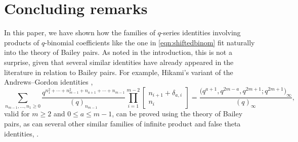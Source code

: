\documentclass[pdftex]{sigma}
\numberwithin{equation}{section}
\begin{document}
\section{Concluding remarks}
In this paper, we have shown how the families of $q$-series identities involving products of $q$-binomial coefficients like the one in \eqref{eqn:shiftedbinom} fit naturally into the theory of Bailey pairs. As noted in the introduction, this is not a surprise, given that several similar identities have already appeared in the literature in relation to Bailey pairs. For example, Hikami's variant of the Andrews--Gordon identities \cite{Hi1},
\begin{equation*}
\sum_{n_{m-1}, \dots, n_1 \geq 0} \frac{q^{n_1^2 + \cdots+ n_{m-1}^2 + n_{a+1} + \cdots + n_{m-1}}}{(q)_{n_{m-1}}} \prod_{i=1}^{m-2} \begin{bmatrix} n_{i+1} + \delta_{a,i} \\ n_i \end{bmatrix} = \frac{\bigl(q^{a+1},q^{2m-a},q^{2m+1};q^{2m+1}\bigr)_{\infty}}{(q)_{\infty}},
\end{equation*}
valid for $m \geq 2$ and $0 \leq a \leq m-1$, can be proved using the theory of Bailey pairs, as can several other similar families of infinite product and false theta identities, \cite{Hi1,Lo1,Lo-Sa1}.
\end{document}
